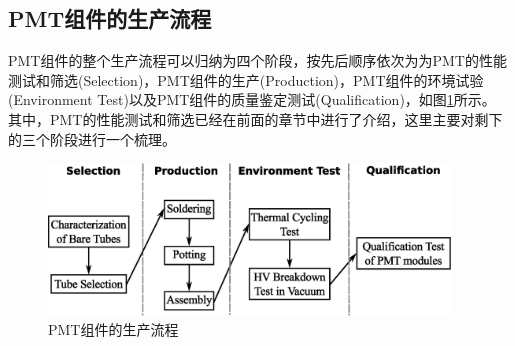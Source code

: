 \subsection{PMT组件的生产流程}
\label{sec:construction:pmt_procedure}
PMT组件的整个生产流程可以归纳为四个阶段，按先后顺序依次为为PMT的性能测试和筛选(Selection)，PMT组件的生产(Production)，PMT组件的环境试验(Environment Test)以及PMT组件的质量鉴定测试(Qualification)，如图\ref{fig:construction:pmt_production_procedure}所示。
其中，PMT的性能测试和筛选已经在前面的章节中进行了介绍，这里主要对剩下的三个阶段进行一个梳理。
\begin{figure}[htbp]
	\centering
	\includegraphics[width=0.95\textwidth]{chap/construction/fig/pmt_production_procedure.eps}
	\caption{PMT组件的生产流程}
	\label{fig:construction:pmt_production_procedure}
\end{figure}
 
